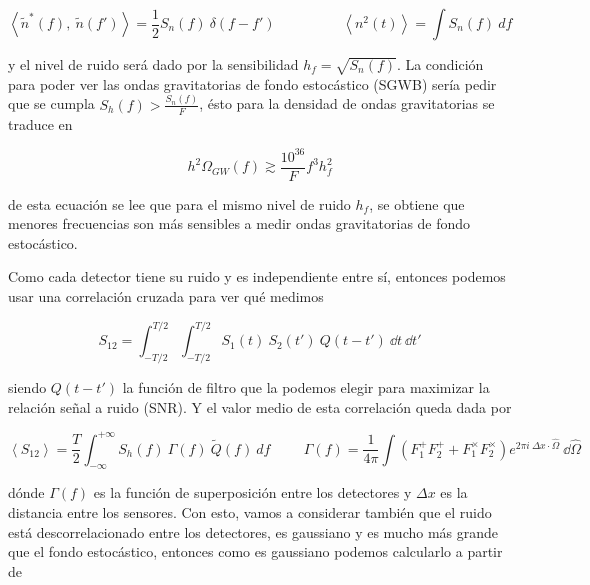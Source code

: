 \begin{equation}
    \left\langle \tilde{n}^* (f), \ \tilde{n} (f') \right\rangle = \frac{1}{2} S_n (f) \ \delta(f - f') \hspace{2cm} \left\langle n^2 (t) \right\rangle = \int S_n (f) \ df
\end{equation}

\noindent
y el nivel de ruido será dado por la sensibilidad $h_f = \sqrt{S_n (f)}$. La condición para poder ver las ondas gravitatorias de fondo estocástico (SGWB) sería pedir que se cumpla $\displaystyle S_h (f) > \frac{S_n (f)}{F}$, ésto para la densidad de ondas gravitatorias se traduce en 

\begin{equation}
    h^2 \Omega_{GW} (f) \gtrsim \frac{10^{36}}{F} f^3 h_f^2  
\end{equation}

\noindent
de esta ecuación se lee que para el mismo nivel de ruido $h_f$, se obtiene que menores frecuencias son más sensibles a medir ondas gravitatorias de fondo estocástico.

Como cada detector tiene su ruido y es independiente entre sí, entonces podemos usar una correlación cruzada para ver qué medimos

\begin{equation}
    S_{12} = \int_{-T/2}^{T/2} \int_{-T/2}^{T/2} S_1 (t) \ S_2 (t') \ Q(t - t') \ \dd t \ \dd t'
\end{equation}

\noindent
siendo $Q (t - t')$ la función de filtro que la podemos elegir para maximizar la relación señal a ruido (SNR). Y el valor medio de esta correlación queda dada por

\begin{equation}
    \left\langle S_{12} \right\rangle = \frac{T}{2} \int^{+ \infty}_{- \infty} S_h (f) \ \Gamma (f) \ \tilde{Q} (f) \ df \hspace{1cm} \Gamma (f) = \frac{1}{4 \pi} \int \left( F_1^+ F_2^+ + F_1^\times F_2^\times \right) e^{\displaystyle 2 \pi i \ \Delta x \cdot \hat{\Omega}} \ \dd \hat{\Omega}
\end{equation}

\noindent
dónde $\Gamma(f)$ es la función de superposición entre los detectores y $\Delta x$ es la distancia entre los sensores. Con esto, vamos a considerar también que el ruido está descorrelacionado entre los detectores, es gaussiano y es mucho más grande que el fondo estocástico, entonces como es gaussiano podemos calcularlo a partir de

